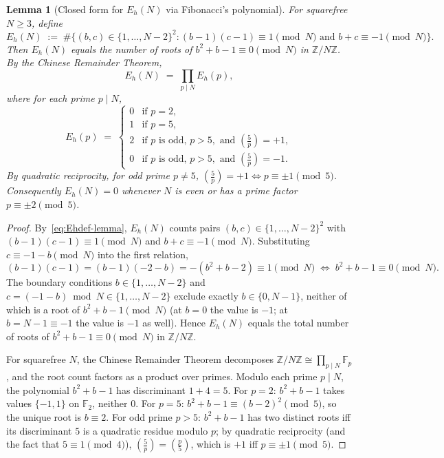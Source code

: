 \documentclass[11pt,reqno]{amsart}
\theoremstyle{plain}
\newtheorem{lemma}[theorem]{Lemma}
\theoremstyle{definition}
\theoremstyle{remark}
\newcommand{\Z}{\mathbb{Z}}
\newcommand{\F}{\mathbb{F}}
\begin{document}
\begin{lemma}[Closed form for $E_{h}(N)$ via Fibonacci's polynomial]\label{lem:Eh}
For squarefree $N\ge 3$, define
\begin{equation}\label{eq:Ehdef-lemma}
  E_{h}(N) \;:=\; \#\bigl\{(b,c)\in\{1,\dots,N-2\}^{2} :
                          (b-1)(c-1)\equiv 1\pmod N
                          \text{ and } b+c\equiv -1\pmod N\bigr\}.
\end{equation}
Then $E_{h}(N)$ equals the number of roots of
$b^{2}+b-1\equiv 0\pmod N$ in $\Z/N\Z$.
By the Chinese Remainder Theorem,
\[
  E_{h}(N) \;=\; \prod_{p\mid N} E_{h}(p),
\]
where for each prime $p\mid N$,
\[
  E_{h}(p) \;=\;
  \begin{cases}
    0 & \text{if } p=2,\\
    1 & \text{if } p=5,\\
    2 & \text{if } p \text{ is odd, } p>5, \text{ and } \left(\tfrac{5}{p}\right)=+1,\\
    0 & \text{if } p \text{ is odd, } p>5, \text{ and } \left(\tfrac{5}{p}\right)=-1.
  \end{cases}
\]
By quadratic reciprocity, for odd prime $p\ne 5$,
$\left(\tfrac{5}{p}\right)=+1 \iff p\equiv\pm 1\pmod 5$. Consequently
$E_{h}(N)=0$ whenever $N$ is even or has a prime factor $p\equiv\pm 2\pmod 5$.
\end{lemma}

\begin{proof}
By~\eqref{eq:Ehdef-lemma}, $E_{h}(N)$ counts pairs
$(b,c)\in\{1,\dots,N-2\}^{2}$ with $(b-1)(c-1)\equiv 1\pmod N$ and
$b+c\equiv -1\pmod N$. Substituting
$c\equiv -1-b\pmod N$ into the first relation,
\[
  (b-1)(c-1)
  =(b-1)(-2-b)
  =-(b^{2}+b-2)
  \equiv 1\pmod N
  \;\Longleftrightarrow\;
  b^{2}+b-1\equiv 0\pmod N.
\]
The boundary conditions $b\in\{1,\dots,N-2\}$ and
$c=(-1-b)\bmod N\in\{1,\dots,N-2\}$ exclude exactly $b\in\{0,N-1\}$,
neither of which is a root of $b^{2}+b-1\pmod N$ (at $b=0$ the value
is $-1$; at $b=N-1\equiv -1$ the value is $-1$ as well). Hence
$E_{h}(N)$ equals the total number of roots of $b^{2}+b-1\equiv 0\pmod N$
in $\Z/N\Z$.

For squarefree $N$, the Chinese Remainder Theorem decomposes
$\Z/N\Z\cong\prod_{p\mid N}\F_{p}$, and the root count factors as a
product over primes. Modulo each prime $p\mid N$, the polynomial
$b^{2}+b-1$ has discriminant $1+4=5$. For $p=2$: $b^{2}+b-1$ takes
values $\{-1,1\}$ on $\F_{2}$, neither $0$. For $p=5$:
$b^{2}+b-1\equiv (b-2)^{2}\pmod 5$, so the unique root is $b\equiv 2$.
For odd prime $p>5$: $b^{2}+b-1$ has two distinct roots iff its
discriminant $5$ is a quadratic residue modulo $p$; by quadratic
reciprocity (and the fact that $5\equiv 1\pmod 4$),
$\left(\tfrac{5}{p}\right)=\left(\tfrac{p}{5}\right)$, which is $+1$
iff $p\equiv\pm 1\pmod 5$.
\end{proof}
\end{document}
